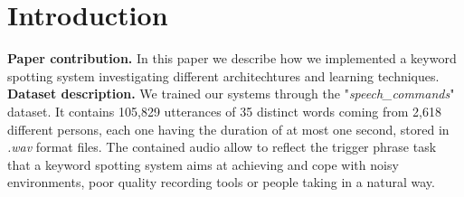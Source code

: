
\section{Introduction}
\label{sec:introduction}

\noindent \textbf{Paper contribution.} In this paper we describe how we implemented a keyword spotting system investigating different architechtures and learning techniques. \\

\noindent \textbf{Dataset description.} We trained our systems through the "{\it speech\_commands}" dataset. It contains 105,829 utterances of 35 distinct words coming from 2,618 different persons, each one having the duration of at most one second, stored in {\it .wav} format files. The contained audio allow to reflect the trigger phrase task that a keyword spotting system aims at achieving and cope with noisy environments, poor quality recording tools or people taking in a natural way. \\\

